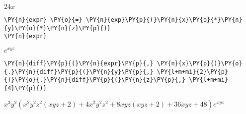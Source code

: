             
    
    $\displaystyle 24 x$

    

    \begin{tcolorbox}[breakable, size=fbox, boxrule=1pt, pad at break*=1mm,colback=cellbackground, colframe=cellborder]
\begin{Verbatim}[commandchars=\\\{\}]
\PY{n}{expr} \PY{o}{=} \PY{n}{exp}\PY{p}{(}\PY{n}{x}\PY{o}{*}\PY{n}{y}\PY{o}{*}\PY{n}{z}\PY{p}{)}
\PY{n}{expr}
\end{Verbatim}
\end{tcolorbox}
 
            
    
    $\displaystyle e^{x y z}$

    

    \begin{tcolorbox}[breakable, size=fbox, boxrule=1pt, pad at break*=1mm,colback=cellbackground, colframe=cellborder]
\begin{Verbatim}[commandchars=\\\{\}]
\PY{n}{diff}\PY{p}{(}\PY{n}{expr}\PY{p}{,} \PY{n}{x}\PY{p}{)}\PY{o}{.}\PY{n}{diff}\PY{p}{(}\PY{n}{y}\PY{p}{,} \PY{l+m+mi}{2}\PY{p}{)}\PY{o}{.}\PY{n}{diff}\PY{p}{(}\PY{n}{z}\PY{p}{,} \PY{l+m+mi}{4}\PY{p}{)}
\end{Verbatim}
\end{tcolorbox}
 
            
    
    $\displaystyle x^{3} y^{2} \left(x^{2} y^{2} z^{2} \left(x y z + 2\right) + 4 x^{2} y^{2} z^{2} + 8 x y z \left(x y z + 2\right) + 36 x y z + 48\right) e^{x y z}$
